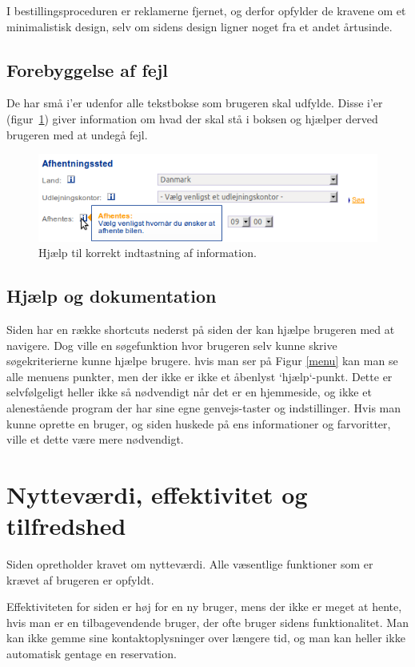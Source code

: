 \documentclass[a4paper]{article}
\begin{document}
I bestillingsproceduren er reklamerne fjernet, og derfor opfylder de kravene om
et minimalistisk design, selv om sidens design ligner noget fra et andet
årtusinde.

\subsection{Forebyggelse af fejl}
De har små i'er udenfor alle tekstbokse som brugeren skal
udfylde. Disse i'er (figur~\ref{help_kontaktinformation}) giver
information om hvad der skal stå i boksen og hjælper derved brugeren
med at undegå fejl.

\begin{figure}[htbp]
  \begin{center}
    \includegraphics[scale=.6]{7.png}
  \end{center}
  \caption{Hjælp til korrekt indtastning af information.}
  \label{help_kontaktinformation}
\end{figure}

\subsection{Hjælp og dokumentation}
Siden har en række shortcuts nederst på siden der kan hjælpe brugeren med at
navigere. Dog ville en søgefunktion hvor brugeren selv kunne skrive søgekriterierne
kunne hjælpe brugere. hvis man ser på Figur \ref{menu} kan man se alle menuens 
punkter, men der ikke er ikke et åbenlyst `hjælp`-punkt. Dette er selvfølgeligt 
heller ikke så nødvendigt når det er en hjemmeside, og ikke et alenestående 
program der har sine egne genvejs-taster og indstillinger. Hvis man kunne oprette
en bruger, og siden huskede på ens informationer og farvoritter, ville et dette
være mere nødvendigt.

\section{Nytteværdi, effektivitet og tilfredshed}
Siden opretholder kravet om nytteværdi. Alle væsentlige funktioner som er krævet
af brugeren er opfyldt.

Effektiviteten for siden er høj for en ny bruger, mens der ikke er meget at
hente, hvis man er en tilbagevendende bruger, der ofte bruger sidens
funktionalitet. Man kan ikke gemme sine kontaktoplysninger over længere tid, og
man kan heller ikke automatisk gentage en reservation.
\end{document}
